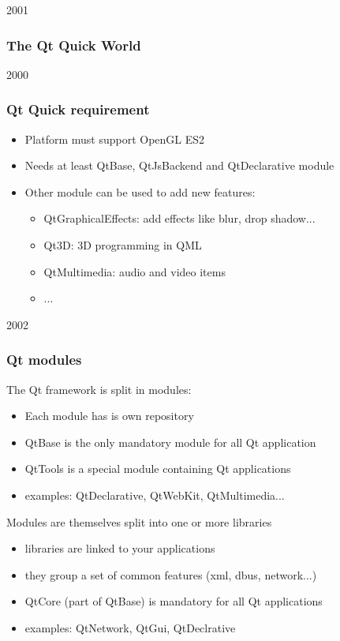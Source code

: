 
\begin{slide}{2001}\frametitle{The Qt Quick World}
\vspace*{15mm}

\end{slide}


\begin{slide}{2000}\frametitle{Qt Quick requirement}
\vspace*{1.5em}
\begin{itemize}
\item Platform must support OpenGL ES2
\item Needs at least QtBase, QtJsBackend and QtDeclarative module
\item Other module can be used to add new features:
\begin{itemize}
\item QtGraphicalEffects: add effects like blur, drop shadow...
\item Qt3D: 3D programming in QML
\item QtMultimedia: audio and video items
\item ...
\end{itemize}
\end{itemize}

\end{slide}

\begin{slide}{2002}\frametitle{Qt modules}
\vspace*{1.5em}
The Qt framework is split in modules:
\begin{itemize}
\item Each module has is own repository
\item QtBase is the only mandatory module for all Qt application
\item QtTools is a special module containing Qt applications
\item examples: QtDeclarative, QtWebKit, QtMultimedia...
\end{itemize}\medskip
Modules are themselves split into one or more libraries
\begin{itemize}
\item libraries are linked to your applications
\item they group a set of common features (xml, dbus, network...)
\item QtCore (part of QtBase) is mandatory for all Qt applications
\item examples: QtNetwork, QtGui, QtDeclrative
\end{itemize}

\end{slide}
